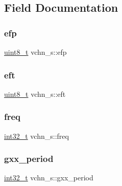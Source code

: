 \subsection{Field Documentation}
\mbox{\label{structvchn__s_a4257c645ab096f2cfe84a28e5e865dd2}} 
\subsubsection{\texorpdfstring{efp}{efp}}
{\footnotesize\ttfamily \hyperlink{inttypes_8h_aba7bc1797add20fe3efdf37ced1182c5}{uint8\+\_\+t} vchn\+\_\+s\+::efp}

\mbox{\label{structvchn__s_a9376074b0b76c7d748e45fa6fd7ea588}} 
\subsubsection{\texorpdfstring{eft}{eft}}
{\footnotesize\ttfamily \hyperlink{inttypes_8h_aba7bc1797add20fe3efdf37ced1182c5}{uint8\+\_\+t} vchn\+\_\+s\+::eft}

\mbox{\label{structvchn__s_ad855168d23dca520770e6b4bf66a1e11}} 
\subsubsection{\texorpdfstring{freq}{freq}}
{\footnotesize\ttfamily \hyperlink{inttypes_8h_a32f2e37ee053cf2ce8ca28d1f74630e5}{int32\+\_\+t} vchn\+\_\+s\+::freq}

\mbox{\label{structvchn__s_a8bf00d8328bdad4d40686a4292d02044}} 
\subsubsection{\texorpdfstring{gxx\+\_\+period}{gxx\_period}}
{\footnotesize\ttfamily \hyperlink{inttypes_8h_a32f2e37ee053cf2ce8ca28d1f74630e5}{int32\+\_\+t} vchn\+\_\+s\+::gxx\+\_\+period}

\mbox{\label{structvchn__s_aaf2f6dd157b4b9c55b99d3ecea102aec}} 
